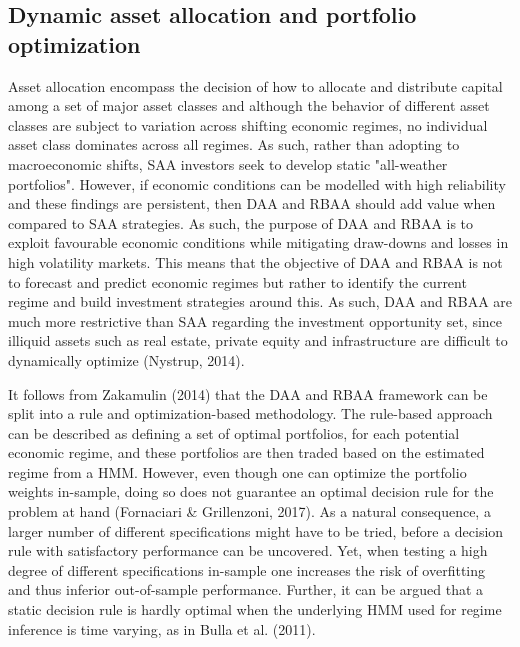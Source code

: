 \subsection{Dynamic asset allocation and portfolio optimization}
Asset allocation encompass the decision of how to allocate and distribute capital among a set of major asset classes and although the behavior of different asset classes are subject to variation across shifting economic regimes, no individual asset class dominates across all regimes. As such, rather than adopting to macroeconomic shifts, SAA investors seek to develop static "all-weather portfolios". However, if economic conditions can be modelled with high reliability and these findings are persistent, then DAA and RBAA should add value when compared to SAA strategies. As such, the purpose of DAA and RBAA is to exploit favourable economic conditions while mitigating draw-downs and losses in high volatility markets. This means that the objective of DAA and RBAA is not to forecast and predict economic regimes but rather to identify the current regime and build investment strategies around this. As such, DAA and RBAA are much more restrictive than SAA regarding the investment opportunity set, since illiquid assets such as real estate, private equity and infrastructure are difficult to dynamically optimize (Nystrup, 2014).

It follows from Zakamulin (2014) that the DAA and RBAA framework can be split into a rule and optimization-based methodology. The rule-based approach can be described as defining a set of optimal portfolios, for each potential economic regime, and these portfolios are then traded based on the estimated regime from a HMM. However, even though one can optimize the portfolio weights in-sample, doing so does not guarantee an optimal decision rule for the problem at hand (Fornaciari \& Grillenzoni, 2017). As a natural consequence, a larger number of different specifications might have to be tried, before a decision rule with satisfactory performance can be uncovered. Yet, when testing a high degree of different specifications in-sample one increases the risk of overfitting and thus inferior out-of-sample performance. Further, it can be argued that a static decision rule is hardly optimal when the underlying HMM used for regime inference is time varying, as in Bulla et al. (2011).

